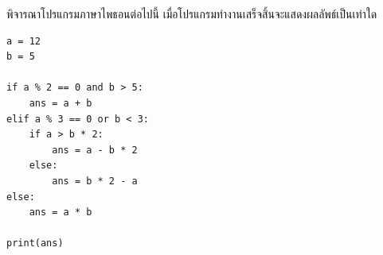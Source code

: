 ﻿%
\question พิจารณาโปรแกรมภาษาไพธอนต่อไปนี้ เมื่อโปรแกรมทำงานเสร็จสิ้นจะแสดงผลลัพธ์เป็นเท่าใด
\begin{verbatim}
a = 12
b = 5

if a % 2 == 0 and b > 5:
    ans = a + b
elif a % 3 == 0 or b < 3:
    if a > b * 2:
        ans = a - b * 2
    else:
        ans = b * 2 - a
else:
    ans = a * b

print(ans)
\end{verbatim}
